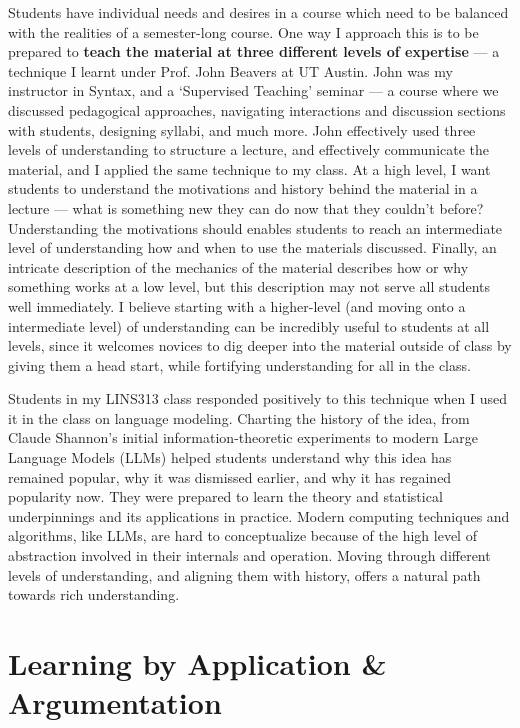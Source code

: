 \documentclass[11pt, letterpaper]{practical-report}
\begin{document}
Students have individual needs and desires in a course which need to be balanced with the realities of a semester-long course. One way I approach this is to be prepared to \textbf{teach the material at three different levels of expertise} --- a technique I learnt under Prof. John Beavers at UT Austin. John was my instructor in Syntax, and a `Supervised Teaching' seminar --- a course where we discussed pedagogical approaches, navigating interactions and discussion sections with students, designing syllabi, and much more. John effectively used three levels of understanding to structure a lecture, and effectively communicate the material, and I applied the same technique to my class. At a high level, I want students to understand the motivations and history behind the material in a lecture --- what is something new they can do now that they couldn't before? Understanding the motivations should enables students to reach an intermediate level of understanding how and when to use the materials discussed. Finally, an intricate description of the mechanics of the material describes how or why something works at a low level, but this description may not serve all students well immediately. I believe starting with a higher-level (and moving onto a intermediate level) of understanding can be incredibly useful to students at all levels, since it welcomes novices to dig deeper into the material outside of class by giving them a head start, while fortifying understanding for all in the class. 

Students in my {\rmcs LINS313} class responded positively to this technique when I used it in the class on language modeling. Charting the history of the idea, from Claude Shannon's initial information-theoretic experiments to modern Large Language Models (LLMs) helped students understand why this idea has remained popular, why it was dismissed earlier, and why it has regained popularity now. They were prepared to learn the theory and statistical underpinnings and its applications in practice. Modern computing techniques and algorithms, like LLMs, are hard to conceptualize because of the high level of abstraction involved in their internals and operation. Moving through different levels of understanding, and aligning them with history, offers a natural path towards rich understanding.

\section*{Learning by Application \& Argumentation}
\end{document}
